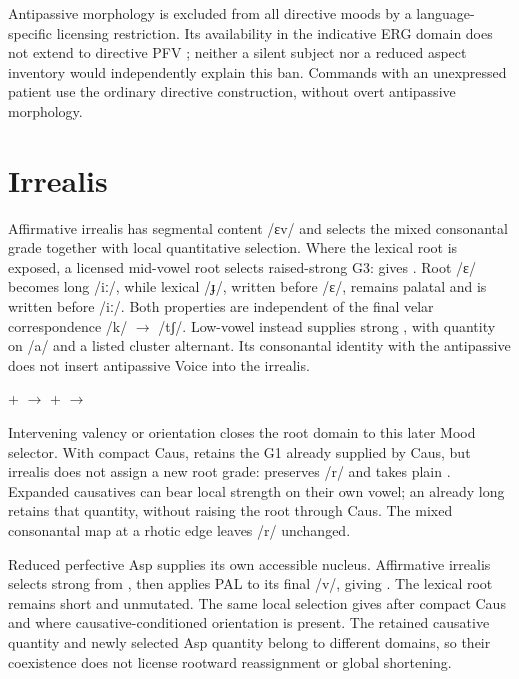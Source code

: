 Antipassive morphology is excluded from all directive moods by a
language-specific licensing restriction. Its availability in the indicative
ERG domain does not extend to directive PFV ; neither a silent
subject nor a reduced aspect inventory would independently explain this ban.
Commands with an unexpressed patient use the ordinary directive construction,
without overt antipassive morphology.

\section{Irrealis}\label{sec:irrealis}

Affirmative irrealis  has segmental content /ɛv/ and selects
the mixed consonantal grade together with local quantitative selection. Where the lexical root is exposed, a
licensed mid-vowel root selects raised-strong G3: 
 gives . Root /ɛ/ becomes long /iː/, while
lexical /ɟ/, written  before /ɛ/, remains palatal and is written
 before /iː/. Both properties are independent of the final velar
correspondence /k/ $\rightarrow$ /tʃ/.
Low-vowel  instead supplies strong ,
with quantity on /a/ and a listed cluster alternant. Its consonantal
identity with the antipassive does not insert antipassive Voice into
the irrealis.

\pex
\a {} +  $\rightarrow$ 
\a {} +  $\rightarrow$ 
\xe

Intervening valency or orientation closes the root domain to this later
Mood selector. With compact Caus,  retains the G1
already supplied by Caus, but irrealis does not assign a new root grade:
 preserves /r/ and takes plain . Expanded
causatives can bear local strength on their own vowel; an already long
 retains that quantity, without raising the root through Caus.
The mixed consonantal map at a rhotic edge leaves /r/ unchanged.

Reduced perfective Asp supplies its own accessible nucleus. Affirmative
irrealis selects strong  from , then applies
PAL to its final /v/, giving . The lexical root
remains short and unmutated. The same local selection gives
 after compact Caus and
 where causative-conditioned orientation
 is present. The retained causative quantity and newly
selected Asp quantity belong to different domains, so their coexistence
does not license rootward reassignment or global shortening.

